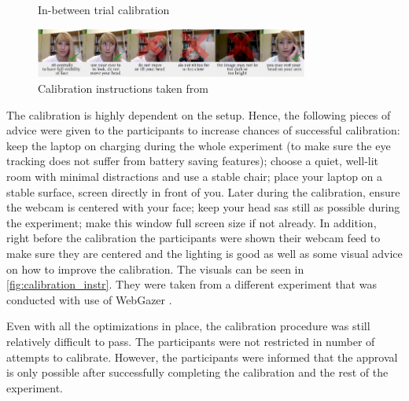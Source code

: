 \begin{figure}
    \centering
    \caption{In-between trial calibration}
    \label{fig:inbetween_calibration_webcam}
\end{figure}

\begin{figure}
    \centering
    \includegraphics[width=0.8\textwidth]{images/calibration_instr.png}
    \caption{Calibration instructions taken from \cite{Semmelmann_2018}}
    \label{fig:calibration_instr}
\end{figure}

The calibration is highly dependent on the setup. Hence, the following pieces of advice were given to the participants to increase chances of successful calibration: keep the laptop on charging during the whole experiment (to make sure the eye tracking does not suffer from battery saving features); choose a quiet, well-lit room with minimal distractions and use a stable chair; place your laptop on a stable surface, screen directly in front of you. Later during the calibration, ensure the webcam is centered with your face; keep your head sas still as possible during the experiment; make this window full screen size if not already. In addition, right before the calibration the participants were shown their webcam feed to make sure they are centered and the lighting is good as well as some visual advice on how to improve the calibration. The visuals can be seen in \autoref{fig:calibration_instr}. They were taken from a different experiment \cite{Semmelmann_2018} that was conducted with use of WebGazer \cite{webgazer}.

Even with all the optimizations in place, the calibration procedure was still relatively difficult to pass. The participants were not restricted in number of attempts to calibrate. However, the participants were informed that the approval is only possible after successfully completing the calibration and the rest of the experiment.


